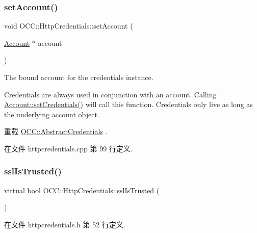 \subsubsection{\texorpdfstring{set\+Account()}{setAccount()}}
{\footnotesize\ttfamily void O\+C\+C\+::\+Http\+Credentials\+::set\+Account (\begin{DoxyParamCaption}\item[{\hyperlink{class_o_c_c_1_1_account}{Account} $\ast$}]{account }\end{DoxyParamCaption})\hspace{0.3cm}{\ttfamily [virtual]}}

The bound account for the credentials instance.

Credentials are always used in conjunction with an account. Calling \hyperlink{class_o_c_c_1_1_account_a254e7934695817014f81b6374a49bad5}{Account\+::set\+Credentials()} will call this function. Credentials only live as long as the underlying account object. 

重载 \hyperlink{class_o_c_c_1_1_abstract_credentials_a9dc52ed1c3138adc446aa24c274cf1a8}{O\+C\+C\+::\+Abstract\+Credentials} .



在文件 httpcredentials.\+cpp 第 99 行定义.

\mbox{\label{class_o_c_c_1_1_http_credentials_aa2d4f550f9f3dd29a280dea9ece2a0ef}} 
\subsubsection{\texorpdfstring{ssl\+Is\+Trusted()}{sslIsTrusted()}}
{\footnotesize\ttfamily virtual bool O\+C\+C\+::\+Http\+Credentials\+::ssl\+Is\+Trusted (\begin{DoxyParamCaption}{ }\end{DoxyParamCaption})\hspace{0.3cm}{\ttfamily [virtual]}}



在文件 httpcredentials.\+h 第 52 行定义.

\mbox{\label{class_o_c_c_1_1_http_credentials_aa3b307bb0e1bd48b5bc55aa9f096d733}} 
